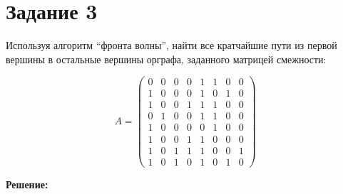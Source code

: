 \section*{Задание 3}

Используя алгоритм “фронта волны”, найти все кратчайшие пути из первой вершины в остальные вершины орграфа, заданного матрицей смежности:

\vspace{\baselineskip}

$$A = \begin{pmatrix}0&0&0&0&1&1&0&0 \\ 1&0&0&0&1&0&1&0 \\ 1&0&0&1&1&1&0&0 \\ 0&1&0&0&1&1&0&0 \\ 1&0&0&0&0&1&0&0 \\ 1&0&0&1&1&0&0&0 \\ 1&0&1&1&1&0&0&1 \\ 1&0&1&0&1&0&1&0  \end{pmatrix}$$

\vspace{\baselineskip}

{\large\textbf{Решение:}}

\vspace{\baselineskip}

